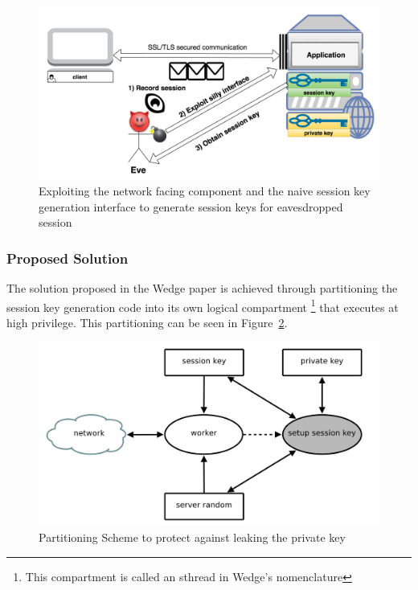 \documentclass[../main.tex]{subfiles}
\begin{document}
\begin{enumerate}
	\begin{figure}[H]
          \centering
          \includegraphics[scale=0.15]{images/attack2.png}
          \caption{Exploiting the network facing component and the
            naive session key generation interface to generate session
            keys for eavesdropped session}
          \label{fig:attack2}
	\end{figure}
\end{enumerate}

\subsubsection*{Proposed Solution}

The solution proposed in the Wedge paper is achieved through
partitioning the session key generation code into its own logical
compartment \footnote{This compartment is called an sthread in Wedge's
  nomenclature} that executes at high privilege. This partitioning can
be seen in Figure~\ref{fig:wedge-partition}.

\begin{figure}[H]
  \centering
  \includegraphics[scale=0.25]{images/compartment_01.png}
  \caption{Partitioning Scheme to protect against leaking the private
    key~\cite{Bittau08}}
  \label{fig:wedge-partition}
\end{figure}
\end{document}

